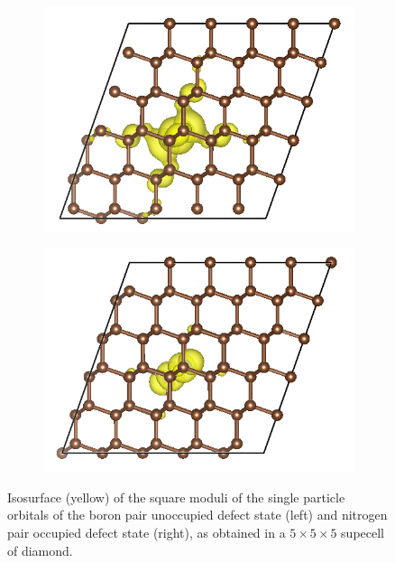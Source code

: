 \documentclass[journal=jctcce,manuscript=article]{achemso}
\begin{document}
\begin{figure}
    \centering
    \begin{subfigure}[b]{0.45\textwidth}
    \includegraphics[width=\linewidth]{fig/two-B-5x5x5.png}
    \end{subfigure}
    \begin{subfigure}[b]{0.45\textwidth}
    \includegraphics[width=\linewidth]{fig/two-N-5x5x5.png}
    \end{subfigure}
    \caption{Isosurface (yellow) of the square moduli of the single particle orbitals of the boron pair unoccupied defect state (left) and nitrogen pair occupied defect state (right), as obtained in a $5\times 5\times 5$ supecell of diamond.}
    \label{fig:defect_structure}
\end{figure}
\end{document}
